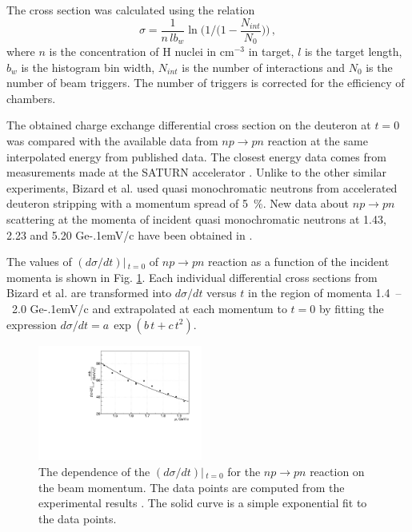 \documentclass[twocolumn,epjc3]{svjour3}
\newcommand{\np}     {\ensuremath{np \rightarrow pn}\xspace}
\newcommand{\GeVc}   {Ge\kern-.1emV/c\xspace}
\begin{document}
The cross section was calculated using the relation
\begin{equation}
  \sigma =
  \frac{1}{n\,lb_w}\ln\bigg(1\Big/\Big(1-\frac{N_{int}}{N_0}\Big)\bigg)\,,
\end{equation}
where $n$ is the concentration of H nuclei in cm$^{-3}$ in target, $l$ is the
target length, $b_w$ is the histogram bin width, $N_{int}$ is the number of
interactions and $N_0$ is the number of beam triggers. The number of triggers is
corrected for the efficiency of chambers.

The obtained charge exchange differential cross section on the deuteron at $t=0$
was compared with the available data from \np reaction at the same interpolated
energy from published data. The closest energy data comes from measurements made
at the SATURN accelerator \cite{biz75,bys78}. Unlike to the other similar
experiments, Bizard et al. \cite{biz75} used quasi monochromatic neutrons from
accelerated deuteron stripping with a momentum spread of 5~\%. New data about
\np scattering at the momenta of incident quasi monochromatic neutrons at 1.43,
2.23 and 5.20 \GeVc have been obtained in \cite{tro14}.

The values of $(d\sigma/dt)|\,_{t=0}$ of \np reaction as a function of the
incident momenta is shown in Fig. \ref{fig:npsigma}. Each individual
differential cross sections from Bizard et al. \cite{biz75} are transformed into
$d\sigma/dt$ versus $t$ in the region of momenta 1.4~--~2.0 \GeVc and
extrapolated at each momentum to $t=0$ by fitting the expression
$d\sigma/dt = a\,\exp(b\,t + c\,t^2)$. %

\begin{figure}[ht]
  \centering
  \includegraphics[width=0.48\textwidth]{np_dSigma.pdf}
  \caption{The dependence of the $(d\sigma/dt)|\,_{t=0}$ for the \np reaction on
    the beam momentum. The data points are computed from the experimental
    results \cite{biz75}. The solid curve is a simple exponential fit to the
    data points.}
  \label{fig:npsigma}
\end{figure}
\end{document}
